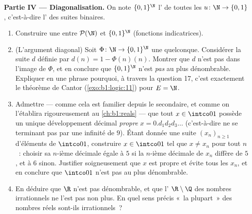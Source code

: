 \begin{problem}
\medskip
\noindent\textbf{Partie IV --- Diagonalisation.} On note $\{0,1\}^{\N}$
l' de toutes les  $u \colon \N \to \{0, 1\}$,
c'est-à-dire l' des suites binaires.
\begin{enumerate}[resume]
  \item Construire une  entre $\mathcal{P}(\N)$ et
        $\{0,1\}^{\N}$ (fonctions indicatrices).
  \item (L'argument diagonal) Soit $\Phi \colon \N \to
        \{0,1\}^{\N}$ une  quelconque. Considérer la suite
        $d$ définie par $d(n) = 1 - \Phi(n)(n)$. Montrer que $d$ n'est
        pas dans l'image de $\Phi$, et en conclure que $\{0,1\}^{\N}$
        n'est \emph{pas} au plus dénombrable. Expliquer en une phrase
        pourquoi, à travers la question 17, c'est exactement le théorème
        de Cantor (\cref{exo:b1:logic:11}) pour $E = \N$.
  \item Admettre --- comme cela est familier depuis le secondaire, et
        comme on l'établira
        rigoureusement au \cref{ch:b1:reals} --- que tout $x \in
        \intco01$ possède un unique développement décimal \emph{propre}
        $x = 0.d_1 d_2 d_3\dots$ (c'est-à-dire ne se terminant pas par
        une infinité de $9$). Étant donnée une suite $(x_n)_{n \geq 1}$
        d'éléments de $\intco01$, construire $x \in \intco01$ tel que
        $x \neq x_n$ pour tout $n$~: choisir sa $n$-ième décimale égale
        à $5$ si la $n$-ième décimale de $x_n$ diffère de $5$, et à $6$
        sinon. Justifier soigneusement que $x$ est propre et évite tous
        les $x_n$, et en conclure que $\intco01$ n'est pas au plus
        dénombrable.
  \item En déduire que $\R$ n'est pas dénombrable, et que l'
        $\R \setminus \Q$ des nombres irrationnels ne l'est pas non
        plus. En quel sens précis «~la plupart~» des nombres réels
        sont-ils irrationnels~?
\end{enumerate}


\end{problem}
